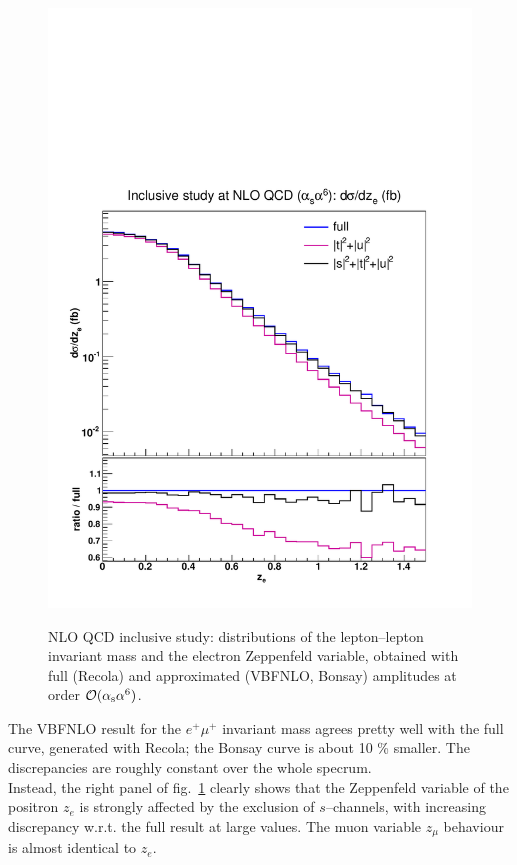 \begin{figure}[hbt]
{\includegraphics[scale=0.35]{figures/scanfigures/zel_nlo.pdf}}
\caption{NLO QCD inclusive study: distributions of the lepton--lepton invariant mass and the electron Zeppenfeld variable, obtained with full ({\sc Recola}) and approximated ({\sc VBFNLO, Bonsay}) amplitudes at order $\mathcal{O}(\alpha_\text{s}\alpha^6)$.} \label{fig:mjjdyjj_1d_3}
\end{figure}
The {\sc VBFNLO} result for the $e^+\mu^+$ invariant mass agrees pretty well with the full curve, generated with {\sc Recola}; the {\sc Bonsay} curve is about 10 \% smaller. The discrepancies are roughly constant over the whole specrum.\\
Instead, the right panel of fig.~\ref{fig:mjjdyjj_1d_3} clearly shows that the Zeppenfeld variable of the positron $z_e$ is strongly affected by the exclusion of $s$--channels, with increasing discrepancy w.r.t. the full result at large values. The muon variable $z_{\mu}$ behaviour is almost identical to $z_e$.\\

